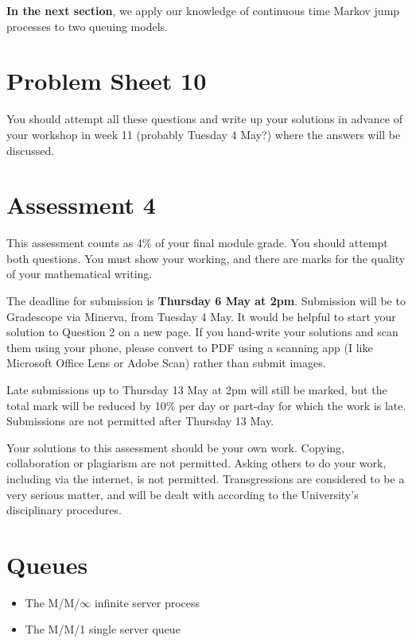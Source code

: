 \documentclass[
  a4paper,
]{article}
\providecommand{\tightlist}{%
  \setlength{\itemsep}{0pt}\setlength{\parskip}{0pt}}
\newif\ifcomm\commtrue
\theoremstyle{definition}
\theoremstyle{definition}
\theoremstyle{definition}
\theoremstyle{remark}
\begin{document}
\textbf{In the next section}, we apply our knowledge of continuous time Markov jump processes to two queuing models.

\hypertarget{P10}{%
\section*{Problem Sheet 10}\label{P10}}

\commfalse

You should attempt all these questions and write up your solutions in advance of your workshop in week 11 (probably Tuesday 4 May?) where the answers will be discussed.

\hypertarget{A4}{%
\section*{Assessment 4}\label{A4}}

This assessment counts as 4\% of your final module grade. You should attempt both questions. You must show your working, and there are marks for the quality of your mathematical writing.

The deadline for submission is \textbf{Thursday 6 May at 2pm}. Submission will be to Gradescope via Minerva, from Tuesday 4 May. It would be helpful to start your solution to Question 2 on a new page. If you hand-write your solutions and scan them using your phone, please convert to PDF using a scanning app (I like Microsoft Office Lens or Adobe Scan) rather than submit images.

Late submissions up to Thursday 13 May at 2pm will still be marked, but the total mark will be reduced by 10\% per day or part-day for which the work is late. Submissions are not permitted after Thursday 13 May.

Your solutions to this assessment should be your own work. Copying, collaboration or plagiarism are not permitted. Asking others to do your work, including via the internet, is not permitted. Transgressions are considered to be a very serious matter, and will be dealt with according to the University's disciplinary procedures.

\hypertarget{S21-queues}{%
\section{Queues}\label{S21-queues}}

\begin{itemize}
\tightlist
\item
  The M/M/\(\infty\) infinite server process
\item
  The M/M/1 single server queue
\end{itemize}
\end{document}
